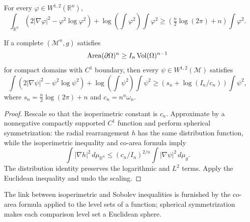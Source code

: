 \begin{theorem}
\label{thm:chow-iii-euclidean-log-sobolev}
For every \(\varphi\in W^{1,2}(\mathbb R^n)\),
\[
 \int_{\mathbb R^n}(2|\nabla\varphi|^2-\varphi^2\log\varphi^2)
 +\log\!\left(\int\varphi^2\right)\int\varphi^2
 \ge\left(\tfrac n2\log(2\pi)+n\right)\int\varphi^2.
\]
\end{theorem}

\begin{theorem}
\label{thm:chow-iii-log-sobolev-isoperimetric}
If a complete \((\mathcal M^n,g)\) satisfies
\[
 \operatorname{Area}(\partial\Omega)^n\ge I_n\operatorname{Vol}(\Omega)^{n-1}
\]
for compact domains with \(C^1\) boundary, then every \(\psi\in W^{1,2}(\mathcal M)\)
satisfies
\[
 \int(2|\nabla\psi|^2-\psi^2\log\psi^2)
 +\log\!\left(\int\psi^2\right)\int\psi^2
 \ge\left(s_n+\log(I_n/c_n)\right)\int\psi^2,
\]
where \(s_n=\frac n2\log(2\pi)+n\) and \(c_n=n^n\omega_n\).
\end{theorem}
\begin{proof}
Rescale so that the isoperimetric constant is \(c_n\).  Approximate by a
nonnegative compactly supported \(C^1\) function and perform spherical
symmetrization: the radial rearrangement \(h\) has the same distribution
function, while the isoperimetric inequality and co-area formula imply
\[
 \int|\nabla h|^2\,d\mu_{\mathbb R^n}
 \le(c_n/I_n)^{2/n}\int|\nabla\psi|^2\,d\mu_g.
\]
The distribution identity preserves the logarithmic and \(L^2\) terms.  Apply
the Euclidean inequality and undo the scaling.
\end{proof}

\begin{remark}
\label{rem:chow-iii-log-sobolev-coarea}
The link between isoperimetric and Sobolev inequalities is furnished by the
co-area formula applied to the level sets of a function; spherical
symmetrization makes each comparison level set a Euclidean sphere.
\end{remark}

